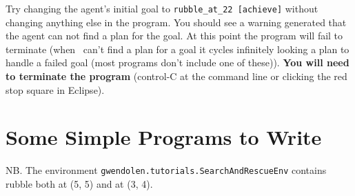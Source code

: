 Try changing the agent's initial goal to \lstinline{rubble_at_22 [achieve]} without changing anything else in the program.  You should see a warning generated that the agent can not find a plan for the goal.  At this point the program will fail to terminate (when \gwendolen\ can't find a plan for a goal it cycles infinitely looking a plan to handle a failed goal (most programs don't include one of these)).  {\bf You will need  to terminate the program} (control-C at the command line or clicking the red stop square in Eclipse). 

\section{Some Simple Programs to Write}
\label{ex:tutorial3}
NB.  The environment
\texttt{gwendolen.tutorials.SearchAndRescueEnv} contains rubble both at (5, 5) and at (3, 4). 
